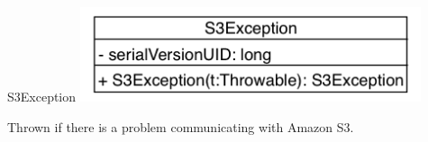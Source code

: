 \begin{XeClass}{S3Exception}
\includegraphics[width=10cm]{cdig/S3Exception.png}
     
 Thrown if there is a problem communicating with Amazon S3.

\end{XeClass}
